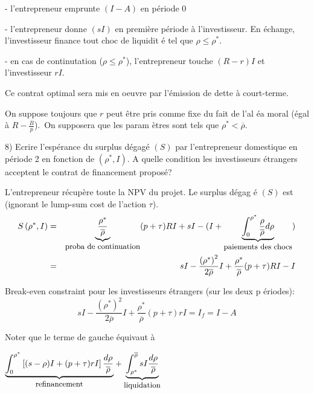 \documentclass[a4paper]{article}
\begin{document}
- l'entrepreneur emprunte $(I-A)$ en p\'{e}riode $0$

- l'entrepreneur donne $(sI)$ en premi\`{e}re p\'{e}riode \`{a}
l'investisseur. En \'{e}change, l'investisseur finance tout choc de liquidit%
\'{e} tel que $\rho \leq \rho ^{\ast }$.

- en cas de continutation ($\rho \leq \rho ^{\ast }$), l'entrepreneur touche 
$(R-r)I$ et l'investisseur $rI$.

\bigskip

Ce contrat optimal sera mis en oeuvre par l'\'{e}mission de dette \`{a}
court-terme.

On suppose toujours que $r$ peut \^{e}tre pris comme fixe du fait de l'al%
\'{e}a moral (\'{e}gal \`{a} $R-\frac{B}{p}$).\ On supposera que les param%
\`{e}tres sont tels que $\rho ^{\ast }<\overline{\rho }$.

\bigskip

8) Ecrire l'esp\'{e}rance du surplus d\'{e}gag\'{e} $(S)$ par l'entrepreneur
domestique en p\'{e}riode 2 en fonction de $(\rho ^{\ast },I)$. A quelle
condition les investisseurs \'{e}trangers acceptent le contrat de
financement propos\'{e}?

\bigskip \pagebreak

L'entrepreneur r\'{e}cup\`{e}re toute la NPV du projet. Le surplus d\'{e}gag%
\'{e} $(S)$ est (ignorant le lump-sum cost de l'action $\tau $).%
\begin{eqnarray*}
S\left( \rho ^{\ast },I\right) &=&\underset{\text{{\small proba de\
continuation}}}{\underbrace{\frac{\rho ^{\ast }}{\overline{\rho }}}}(p+\tau
)RI+sI-(I+\underset{\text{{\small paiements des chocs}}}{\underbrace{%
\int_{0}^{\rho ^{\ast }}\frac{\rho }{\overline{\rho }}d\rho }}) \\
&=&sI-\frac{\left( \rho ^{\ast }\right) ^{2}}{2\overline{\rho }}I+\frac{\rho
^{\ast }}{\overline{\rho }}(p+\tau )RI-I
\end{eqnarray*}

Break-even constraint pour les investisseurs \'{e}trangers (sur les deux p%
\'{e}riodes):%
\begin{equation*}
sI-\frac{\left( \rho ^{\ast }\right) ^{2}}{2\overline{\rho }}I+\frac{\rho
^{\ast }}{\overline{\rho }}(p+\tau )rI=I_{f}=I-A
\end{equation*}

Noter que le terme de gauche \'{e}quivaut \`{a}

$\underset{\text{{\small refinancement}}}{\underbrace{\int_{0}^{\rho ^{\ast
}}\left[ (s-\rho )I+(p+\tau )rI\right] \frac{d\rho }{\overline{\rho }}}}+%
\underset{\text{{\small liquidation}}}{\underbrace{\int_{\rho ^{\ast }}^{%
\overline{\rho }}sI\frac{d\rho }{\overline{\rho }}}}$
\end{document}
